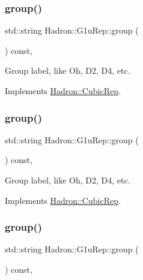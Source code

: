 \subsubsection{\texorpdfstring{group()}{group()}\hspace{0.1cm}{\footnotesize\ttfamily [1/3]}}
{\footnotesize\ttfamily std\+::string Hadron\+::\+G1u\+Rep\+::group (\begin{DoxyParamCaption}{ }\end{DoxyParamCaption}) const\hspace{0.3cm}{\ttfamily [inline]}, {\ttfamily [virtual]}}

Group label, like Oh, D2, D4, etc. 

Implements \mbox{\hyperlink{structHadron_1_1CubicRep_a0748f11ec87f387062c8e8981339a29c}{Hadron\+::\+Cubic\+Rep}}.

\mbox{\label{structHadron_1_1G1uRep_a8d180c78f98256ab0c502e87e2495295}} 
\subsubsection{\texorpdfstring{group()}{group()}\hspace{0.1cm}{\footnotesize\ttfamily [2/3]}}
{\footnotesize\ttfamily std\+::string Hadron\+::\+G1u\+Rep\+::group (\begin{DoxyParamCaption}{ }\end{DoxyParamCaption}) const\hspace{0.3cm}{\ttfamily [inline]}, {\ttfamily [virtual]}}

Group label, like Oh, D2, D4, etc. 

Implements \mbox{\hyperlink{structHadron_1_1CubicRep_a0748f11ec87f387062c8e8981339a29c}{Hadron\+::\+Cubic\+Rep}}.

\mbox{\label{structHadron_1_1G1uRep_a8d180c78f98256ab0c502e87e2495295}} 
\subsubsection{\texorpdfstring{group()}{group()}\hspace{0.1cm}{\footnotesize\ttfamily [3/3]}}
{\footnotesize\ttfamily std\+::string Hadron\+::\+G1u\+Rep\+::group (\begin{DoxyParamCaption}{ }\end{DoxyParamCaption}) const\hspace{0.3cm}{\ttfamily [inline]}, {\ttfamily [virtual]}}

